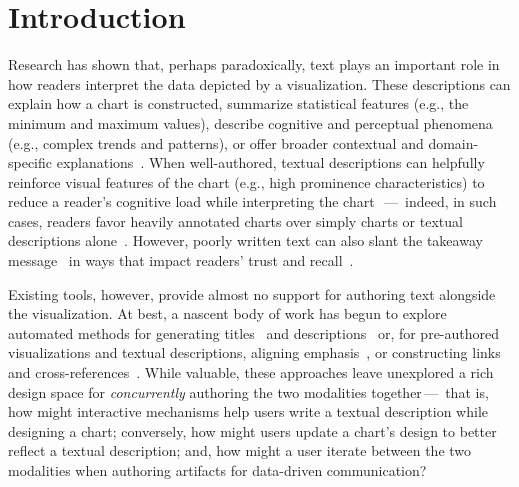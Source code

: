 \section{Introduction}

Research has shown that, perhaps paradoxically, text plays an important role in how readers interpret the data depicted by a visualization. These descriptions can explain how a chart is constructed, summarize statistical features (e.g., the minimum and maximum values), describe cognitive and perceptual phenomena (e.g., complex trends and patterns), or offer broader contextual and domain-specific explanations~\cite{lundgard2021accessible}.
When well-authored, textual descriptions can helpfully reinforce visual features of the chart (e.g., high prominence characteristics) to reduce a reader's cognitive load while interpreting the chart~\cite{kim2021towards}\,---\, indeed, in such cases, readers favor heavily annotated charts over simply charts or textual descriptions alone~\cite{stokes2022striking}. However, poorly written text can also slant the takeaway message~\cite{kong2018frames} in ways that impact readers' trust and recall~\cite{kong2019trust}.

Existing tools, however, provide almost no support for authoring text alongside the visualization. At best, a nascent body of work has begun to explore automated methods for generating titles~\cite{liu2023autotitle} and descriptions~\cite{choi2022intentable,obeid2020chart,hsu2024scicapenter} or, for pre-authored visualizations and textual descriptions, aligning emphasis~\cite{kim2023emphasischecker}, or constructing links and cross-references~\cite{latif2021kori}. While valuable, these approaches leave unexplored a rich design space for \emph{concurrently} authoring the two modalities together\,---\, that is, how might interactive mechanisms help users write a textual description while designing a chart; conversely, how might users update a chart's design to better reflect a textual description; and, how might a user iterate between the two modalities when authoring artifacts for data-driven communication?

